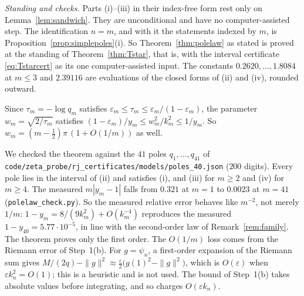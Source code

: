 \documentclass[11pt]{article}
\theoremstyle{plain}
\theoremstyle{definition}
\theoremstyle{remark}
\begin{document}
\noindent\emph{Standing and checks.} Parts \textup{(i)}--\textup{(iii)} in their index-free form
rest only on Lemma~\ref{lem:sandwich}. They are unconditional and have no computer-assisted step. The
identification $n=m$, and with it the statements indexed by $m$, is
Proposition~\ref{prop:simplepoles}\textup{(i)}. So Theorem~\ref{thm:polelaw} as stated is proved at the
standing of Theorem~\ref{thm:Tstar}, that is, with the interval certificate \eqref{eq:Tstarcert} as its
one computer-assisted input. The constants $0.2620,\dots,1.8084$ at $m\le3$ and $2.39116$ are
evaluations of the closed forms of (ii) and (iv), rounded outward.

Since $\tau_m=-\log q_m$ satisfies $\varepsilon_m\le\tau_m\le\varepsilon_m/(1-\varepsilon_m)$, the
parameter $w_m=\sqrt{2/\tau_m}$ satisfies
$(1-\varepsilon_m)/y_m\le w_m^2/k_m^2\le1/y_m$. So $w_m=(m-\tfrac12)\pi\,(1+O(1/m))$ as well.

We checked the theorem against the $41$ poles $q_1,\dots,q_{41}$ of
\texttt{code/\allowbreak zeta\_probe/\allowbreak rj\_certificates/\allowbreak models/\allowbreak poles\_40.json} ($200$ digits). Every pole lies in
the interval of (ii) and satisfies (i), and (iii) for $m\ge2$ and (iv) for $m\ge4$. The measured
$m|y_m-1|$ falls from $0.321$ at $m=1$ to $0.0023$ at $m=41$ (\texttt{polelaw\_check.py}). So the measured
relative error behaves like $m^{-2}$, not merely $1/m$: $1-y_m=8/(9k_m^2)+O(k_m^{-4})$ reproduces the
measured $1-y_{40}=5.77\cdot10^{-5}$, in line with the second-order law of Remark~\ref{rem:family}.
The theorem proves only the first order. The $O(1/m)$ loss comes from the Riemann error of
Step~1(b). For $g=\psi_n$, a first-order expansion of the Riemann sum gives
$M/(2q)-\|g\|^2\approx\tfrac\varepsilon2\bigl(g(1)^2-\|g\|^2\bigr)$, which is $O(\varepsilon)$ when
$\varepsilon k_n^2=O(1)$; this is a heuristic and is not used. The bound of Step~1(b) takes absolute
values before integrating, and so charges $O(\varepsilon k_n)$.
\end{document}
